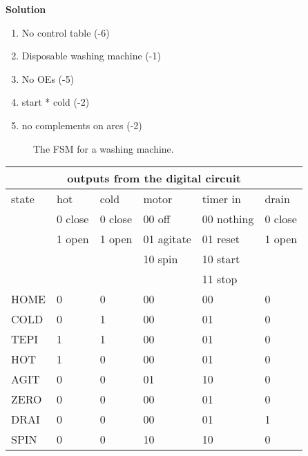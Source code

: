 \begin{enumerate}
        \begin{onlysolution}  \textbf{Solution} \itshape{
                \begin{enumerate}
                    \item No control table (-6)
                    \item Disposable washing machine (-1)
                    \item No OEs (-5)
                    \item start * cold (-2)
                    \item no complements on arcs (-2)
                \end{enumerate}
                \begin{figure}[ht]
                    \caption{The FSM for a washing machine.}
                \end{figure}

                \begin{tabular}{|l|||l|l|l|l|l|} \hline
                    \multicolumn{6}{|c|}{outputs from the digital circuit}            \\ \hline \hline
                    state & hot     & cold    & motor      & timer in   & drain     \\ \hline
                    & 0 close & 0 close & 00 off     & 00 nothing & 0 close    \\ \hline
                    & 1 open  & 1 open  & 01 agitate & 01 reset   & 1 open    \\ \hline
                    &        &         & 10 spin    & 10 start   &        \\ \hline
                    &        &         &           & 11 stop    &        \\ \hline \hline
                    HOME  &    0    & 0      & 00           & 00        & 0        \\ \hline
                    COLD  &    0    & 1      & 00           & 01        & 0        \\ \hline
                    TEPI  &    1    & 1      & 00           & 01        & 0        \\ \hline
                    HOT   &    1    & 0      & 00           & 01        & 0        \\ \hline
                    AGIT  &    0    & 0      & 01           & 10        & 0        \\ \hline
                    ZERO  &    0    & 0      & 00           & 01        & 0        \\ \hline
                    DRAI  &    0    & 0      & 00           & 01        & 1        \\ \hline
                    SPIN  &    0    & 0      & 10           & 10        & 0        \\ \hline
                \end{tabular}

}
\end{onlysolution}
\end{enumerate}
